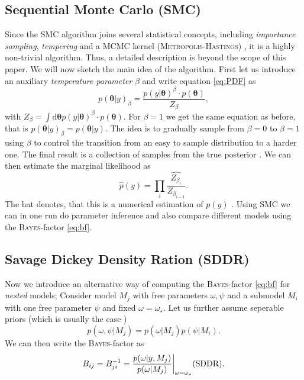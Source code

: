 \documentclass[%
 reprint,
 amsmath,amssymb,
 aps,
]{revtex4-1}
\newcommand{\btheta}{\boldsymbol{\theta}}
\begin{document}
\subsection{Sequential Monte Carlo (SMC)}\label{sec:SMC}
 \noindent Since the SMC algorithm joins several statistical concepts, including \emph{importance sampling}, \emph{tempering} and a MCMC kernel (\textsc{Metropolis-Hastings}) \cite{PyMC3_SMC}, it is a highly non-trivial algorithm. Thus, a detailed description is beyond the scope of this paper. We will now sketch the main idea of the algorithm. 
 First let us introduce an auxiliary \emph{temperature parameter} $\beta$ and write equation \eqref{eq:PDF} as 
   $$p(\btheta|y)_\beta=\frac{p(y|\btheta)^\beta\cdot p(\btheta)}{Z_\beta},$$
   with $Z_\beta=\int\text{d}\btheta p(y|\btheta)^\beta\cdot p(\btheta)$. For $\beta=1$ we get the same equation as before, that is $p(\btheta|y)_\beta=p(\btheta|y)$. The idea is to gradually sample from $\beta=0$ to $\beta=1$ using $\beta$ to control the transition from an easy to sample distribution to a harder one. The final result is a collection of samples from the true posterior \cite{PyMC3_SMC}. We can then estimate the marginal likelihood as \cite{SMC_PEPE} \begin{equation}\label{eq:with_the_hat}
   	\hat{p}(y)=\prod_{i}\widehat{\frac{Z_{\beta_i}}{Z_{\beta_{i-1}}}}.
   \end{equation}
     The hat denotes, that this is a numerical estimation of $p(y)$ \cite{SMC_PEPE}. Using SMC we can in one run do parameter inference and also compare different models using the \textsc{Bayes}-factor \eqref{eq:bf}.
 
\subsection{Savage Dickey Density Ration (SDDR)} \label{subsec:sddr}
Now we introduce an alternative way of computing the \textsc{Bayes}-factor \eqref{eq:bf} for \emph{nested} models; Consider model $M_j$ with free parameters $\omega,\psi$ and a submodel $M_i$ with one free parameter $\psi$ and fixed $\omega=\omega_\star$. Let us further assume seperable priors (which is usually the case \cite{trotta}) $$p(\omega,\psi|M_j)=p(\omega|M_j)p(\psi|M_i).$$
We can then write the \textsc{Bayes}-factor as \cite{trotta} \begin{equation}
	\label{eq:sddr}
	B_{ij}=B_{ji}^{-1}=\frac{p(\omega|y,M_j)}{p(\omega|M_j)}\bigg|_{\omega=\omega_\star}  \text{\hfill (SDDR)}.
\end{equation}
\end{document}
